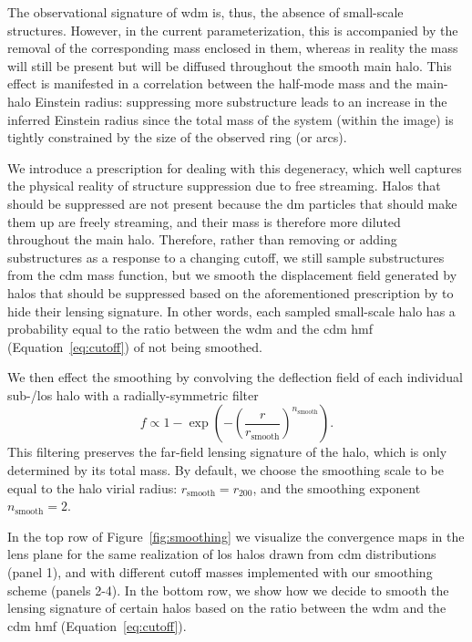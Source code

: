 The observational signature of \gls*{wdm} is, thus, the absence of small-scale structures. However, in the current parameterization, this is accompanied by the removal of the corresponding mass enclosed in them, whereas in reality the mass will still be present but will be diffused throughout the smooth main halo. This effect is manifested in a correlation between the half-mode mass and the main-halo Einstein radius: suppressing more substructure leads to an increase in the inferred Einstein radius since the total mass of the system (within the image) is tightly constrained by the size of the observed ring (or arcs).

We introduce a prescription for dealing with this degeneracy, which well captures the physical reality of structure suppression due to free streaming. 
Halos that should be suppressed are not present because the \gls*{dm} particles that should make them up are freely streaming, and their mass is therefore more diluted throughout the main halo.
Therefore, rather than removing or adding substructures as a response to a changing cutoff, we still sample substructures from the \gls*{cdm} mass function, but we smooth the displacement field generated by halos that should be suppressed based on the aforementioned prescription by \cite{Lovell:2020bcy} to hide their lensing signature. In other words, each sampled small-scale halo has a probability equal to the ratio between the \gls*{wdm} and the \gls*{cdm} \gls*{hmf} (Equation~\eqref{eq:cutoff}) of not being smoothed. 

We then effect the smoothing by convolving the deflection field of each individual sub-/\gls*{los} halo with a radially-symmetric filter
\begin{equation}
f \propto 1 - \exp\left(-\left(\frac{r}{r_{\mathrm{smooth}}}\right)^{n_{\mathrm{smooth}}}\right).
\end{equation}
This filtering preserves the far-field lensing signature of the halo, which is only determined by its total mass.
By default, we choose the smoothing scale to be equal to the halo virial radius: $r_\mathrm{smooth}=r_{200}$, and the smoothing exponent $n_\mathrm{smooth}=2$.

In the top row of Figure~\ref{fig:smoothing} we visualize the convergence maps in the lens plane for the same realization of \gls*{los} halos drawn from \gls*{cdm} distributions (panel 1), and with different cutoff masses implemented with our smoothing scheme (panels 2-4). In the bottom row, we show how we decide to smooth the lensing signature of certain halos based on the ratio between the \gls*{wdm} and the \gls*{cdm} \gls*{hmf} (Equation~\eqref{eq:cutoff}). 


